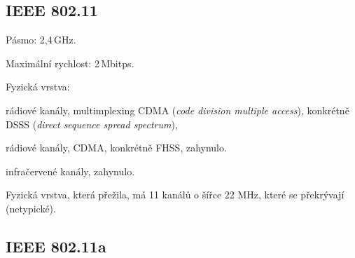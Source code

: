 \subsection{IEEE 802.11}

\begin{compactitem}
    \item Pásmo: 2,4\,GHz.

    \item Maximální rychlost: 2\,Mbitps.

    \item Fyzická vrstva: \begin{compactitem}
        \item rádiové kanály, multimplexing CDMA (\textit{code division multiple access}), konkrétně DSSS (\textit{direct sequence spread spectrum}),
        \item rádiové kanály, CDMA, konkrétně FHSS, zahynulo.
        \item infračervené kanály, zahynulo.
    \end{compactitem}

    \item Fyzická vrstva, která přežila, má 11 kanálů o šířce 22 MHz, které se překrývají (netypické).
\end{compactitem}

\subsection{IEEE 802.11a}

